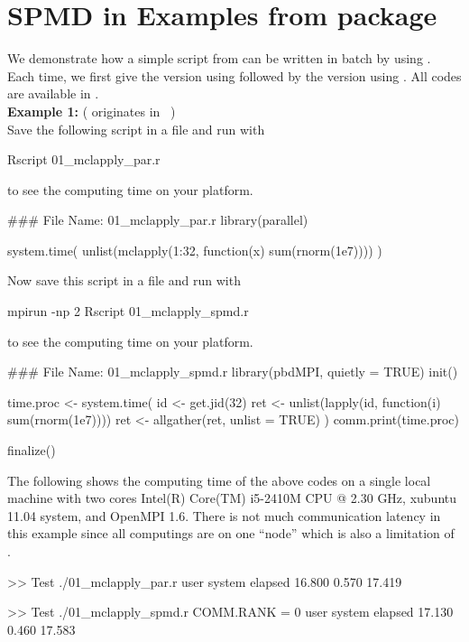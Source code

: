 
\section[SPMD in Examples from package \pkg{parallel}]{SPMD in Examples from package }
\label{sec:analog_examples}

We demonstrate how a simple script from  can be
written in batch by using .  Each time, we first give the
version using  followed by the
version using . All codes are available in
. \\

{\bf Example 1:}
( originates in ~\citep{Urbanek2011}) \\
Save the following script in a file and run with
\begin{Command}
Rscript 01_mclapply_par.r
\end{Command}
to see the computing time on your platform.
\begin{Code}[title=\pkg{multicore} R Script]
### File Name: 01_mclapply_par.r
library(parallel)

system.time(
  unlist(mclapply(1:32, function(x) sum(rnorm(1e7))))
)
\end{Code}
Now save this script in a file and run with
\begin{Command}
mpirun -np 2 Rscript 01_mclapply_spmd.r
\end{Command}
to see the computing time on your platform.
\begin{Code}[title=SPMD R Script]
### File Name: 01_mclapply_spmd.r
library(pbdMPI, quietly = TRUE)
init()

time.proc <- system.time({
  id <- get.jid(32)
  ret <- unlist(lapply(id, function(i) sum(rnorm(1e7))))
  ret <- allgather(ret, unlist = TRUE)
})
comm.print(time.proc)

finalize()
\end{Code}

The following shows the computing time of the above codes
on a single local machine with two cores
Intel(R) Core(TM) i5-2410M CPU @ 2.30 GHz, xubuntu 11.04 system,
and OpenMPI 1.6. There is not much communication latency in this example
since all computings are on one ``node'' which is also
a limitation of .
\begin{CodeOutput}
>> Test ./01_mclapply_par.r
   user  system elapsed
 16.800   0.570  17.419

>> Test ./01_mclapply_spmd.r
COMM.RANK = 0
   user  system elapsed
 17.130   0.460  17.583
\end{CodeOutput}


